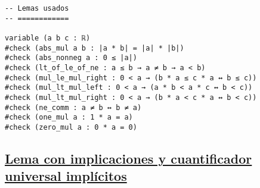 \begin{verbatim}
-- Lemas usados
-- ============

variable (a b c : ℝ)
#check (abs_mul a b : |a * b| = |a| * |b|)
#check (abs_nonneg a : 0 ≤ |a|)
#check (lt_of_le_of_ne : a ≤ b → a ≠ b → a < b)
#check (mul_le_mul_right : 0 < a → (b * a ≤ c * a ↔ b ≤ c))
#check (mul_lt_mul_left : 0 < a → (a * b < a * c ↔ b < c))
#check (mul_lt_mul_right : 0 < a → (b * a < c * a ↔ b < c))
#check (ne_comm : a ≠ b ↔ b ≠ a)
#check (one_mul a : 1 * a = a)
#check (zero_mul a : 0 * a = 0)
\end{verbatim}

\subsection{\href{./src/Logica/Lema\_con\_implicaciones\_y\_cuantificador\_universal\_implicitos.lean}{Lema con implicaciones y cuantificador universal implícitos}}
\label{sec:org440f2b3}
